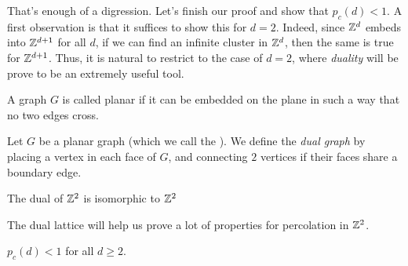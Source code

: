 \documentclass[a4paper]{article}
\begin{document}
That's enough of a digression. Let's finish our proof and show that $p_c(d) < 1$. A first observation is that it suffices to show this for $d = 2$. Indeed, since $\mathbb{Z}^d$ embeds into $\mathbb{Z}^{d + 1}$ for all $d$, if we can find an infinite cluster in $\mathbb{Z}^d$, then the same is true for $\mathbb{Z}^{d + 1}$. Thus, it is natural to restrict to the case of $d = 2$, where \emph{duality} will be prove to be an extremely useful tool.

\begin{defi}
  A graph $G$ is called planar if it can be embedded on the plane in such a way that no two edges cross.
\end{defi}

\begin{defi}
  Let $G$ be a planar graph (which we call the ). We define the \emph{dual graph} by placing a vertex in each face of $G$, and connecting $2$ vertices if their faces share a boundary edge.
\end{defi}

\begin{eg}
  The dual of $\mathbb{Z}^2$ is isomorphic to $\mathbb{Z}^2$ %
  \begin{center}
  \end{center}
\end{eg}
The dual lattice will help us prove a lot of properties for percolation in $\mathbb{Z}^2$.

\begin{lemma}
  $p_c(d) < 1$ for all $d \geq 2$.
\end{lemma}
\end{document}
